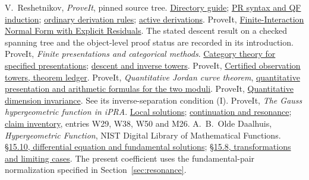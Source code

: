 \documentclass[11pt,letterpaper]{article}
\theoremstyle{definition}\newtheorem{definition}[theorem]{Definition}
\newcommand{\gitfile}[2]{\href{https://github.com/VladimirReshetnikov/ProveIt/blob/3ee850b4c2d650cf01263823fd5415963747c5d0/Logic/PrimitiveRecursiveArithmetic/#1}{#2}}
\newcommand{\gitdir}[2]{\href{https://github.com/VladimirReshetnikov/ProveIt/tree/3ee850b4c2d650cf01263823fd5415963747c5d0/Logic/PrimitiveRecursiveArithmetic/#1}{#2}}
\begin{document}







\begin{thebibliography}{9}\small
{} V.\ Reshetnikov, \emph{ProveIt}, pinned source tree.
\gitfile{README.md}{Directory guide};
\gitfile{ConciseIPRA/Lean/ConciseIPRA/PR.lean}{PR syntax and QF induction};
\gitfile{ConciseIPRA/Lean/ConciseIPRA/Deduction.lean}{ordinary derivation rules};
\gitdir{Derivations/Lean/IPRADerivations}{active derivations}.
 ProveIt, \gitfile{docs/proofs/foundations/FINER-iPRA-framework-2026-11-16/README.md}{Finite-Interaction Normal Form with Explicit Residuals}. The stated descent result on a checked spanning tree and the object-level proof status are recorded in its introduction.
 ProveIt, \emph{Finite presentations and categorical methods}.
\gitfile{docs/proofs/foundations/ipra_categorical_methods/paper/sections/04_categories.tex}{Category theory for specified presentations};
\gitfile{docs/proofs/foundations/ipra_categorical_methods/paper/sections/05_descent.tex}{descent and inverse towers}.
 ProveIt, \gitfile{docs/proofs/topology/ipra_topology_framework_2026-11-15/THEOREM_LEDGER.md}{Certified observation towers, theorem ledger}.
 ProveIt, \emph{Quantitative Jordan curve theorem},
\gitfile{docs/proofs/topology/jordan_ipra_constructive_2026-11-15/sections/01_statement.tex}{quantitative presentation and arithmetic formulas for the two moduli}.
 ProveIt, \gitfile{docs/proofs/topology/dimension_invariance_ipra/dimension_invariance.tex}{Quantitative dimension invariance}. See its inverse-separation condition (I).
 ProveIt, \emph{The Gauss hypergeometric function in iPRA}.
\gitfile{docs/proofs/analysis/hypergeometric_ipra_2026-11-16/sections/05_ode.tex}{Local solutions};
\gitfile{docs/proofs/analysis/hypergeometric_ipra_2026-11-16/sections/10_continuation.tex}{continuation and resonance};
\gitfile{docs/proofs/analysis/hypergeometric_ipra_2026-11-16/theorem_inventory.csv}{claim inventory}, entries W29, W38, W50 and M26.
 A.\ B.\ Olde Daalhuis, \emph{Hypergeometric Function}, NIST Digital Library of Mathematical Functions. \href{https://dlmf.nist.gov/15.10}{\S15.10, differential equation and fundamental solutions};
\href{https://dlmf.nist.gov/15.8}{\S15.8, transformations and limiting cases}. The present coefficient uses the fundamental-pair normalization specified in Section~\ref{sec:resonance}.
\end{thebibliography}
\end{document}
